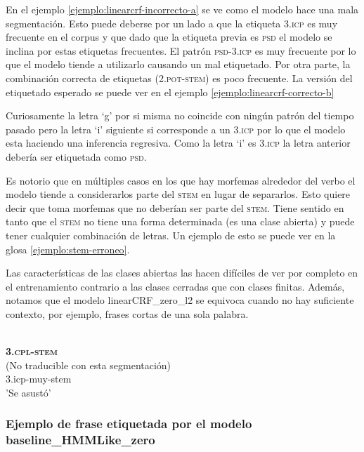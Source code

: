 \documentclass[letterpaper,12pt,oneside]{book}
\theoremstyle{definition}
\begin{document}
En el ejemplo \ref{ejemplo:linearcrf-incorrecto-a} se ve como el modelo hace una mala segmentación. Esto puede deberse por un lado a que la etiqueta \textsc{3.icp} es muy frecuente en el corpus y que dado que la etiqueta previa es \textsc{psd} el modelo se inclina por estas etiquetas frecuentes. El patrón \textsc{psd-3.icp} es muy frecuente por lo que el modelo tiende a utilizarlo causando un mal etiquetado. Por otra parte, la combinación correcta de etiquetas (\textsc{2.pot-stem}) es poco frecuente. La versión del etiquetado esperado se puede ver en el ejemplo \ref{ejemplo:linearcrf-correcto-b}

Curiosamente la letra `g' por si misma no coincide con ningún patrón del tiempo pasado pero la letra `i' siguiente si corresponde a un \textsc{3.icp} por lo que el modelo esta haciendo una inferencia regresiva. Como  la letra `i' es \textsc{3.icp} la letra anterior debería ser etiquetada como \textsc{psd}.

Es notorio que en múltiples casos en los que hay morfemas alrededor del verbo el modelo tiende a considerarlos parte del \textsc{stem} en lugar de separarlos. Esto quiere decir que toma morfemas que no deberían ser parte del \textsc{stem}. Tiene sentido en tanto que el \textsc{stem} no tiene una forma determinada (es una clase abierta) y puede tener cualquier combinación de letras. Un ejemplo de esto se puede ver en la glosa \ref{ejemplo:stem-erroneo}.

Las características de las clases abiertas las hacen difíciles de ver por completo en el entrenamiento contrario a las clases cerradas que con clases finitas. Además, notamos que el modelo \textsf{linearCRF\_zero\_l2} se equivoca cuando no hay suficiente contexto, por ejemplo, frases cortas de una sola palabra.

\begin{exe}
\ex \begin{xlist}
    \ex {}\\
    {\textbf{\textsc{3.cpl-stem}}}\\
    \trans (No traducible con esta segmentación)\label{ejemplo:stem-erroneo}
    \ex {}\\
            {3.icp-muy-stem} \\
        \trans 'Se asustó'
    \end{xlist}
\end{exe}


\subsubsection{Ejemplo de frase etiquetada por el modelo \textsf{baseline\_HMMLike\_zero}}
\end{document}
